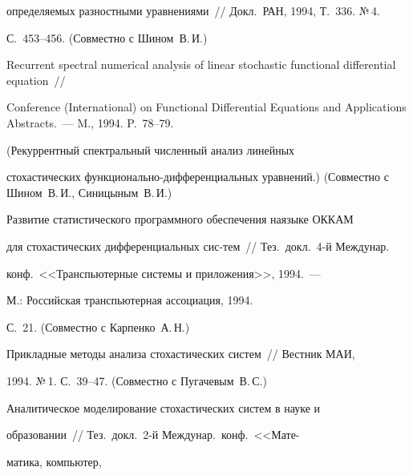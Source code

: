 определяемых разностными уравнениями~// Докл.\ РАН, 1994, Т.~336. №\,4.


С.~453--456. (Совместно с Шином~В.\,И.)





Recurrent spectral numerical analysis of linear stochastic functional differential equation~//


Conference (International) on Functional Differential Equations and Applications Abstracts.~--- M., 1994. P.~78--79.


(Рекуррентный спектральный чис\-лен\-ный анализ линейных


стохастических функ\-ци\-о\-наль\-но-диф\-фе\-рен\-ци\-аль\-ных уравнений.) (Совместно с Шином~В.\,И., Синицыным~В.\,И.)





 Развитие статистического программного обеспечения на\linebreak язы\-ке ОККАМ


для стохастических дифференциальных сис-\linebreak тем~// Тез.\ докл.\ 4-й Междунар.\


конф.\ <<Транспьютерные системы и приложения>>, 1994.~---


М.: Российская транспьютерная ассоциация, 1994.


С.~21. (Совместно с Карпенко~А.\,Н.)





 Прикладные методы анализа стохастических систем~// Вестник МАИ,


1994. №\,1. С.~39--47. (Совместно с Пугачевым~В.\,С.)










 Аналитическое моделирование стохастических систем в науке и


образовании~// Тез.\ докл.\ 2-й Междунар.\ конф.\ <<Мате-\linebreak


\vspace*{-12pt}





\pagebreak


\noindent


матика, компьютер,


